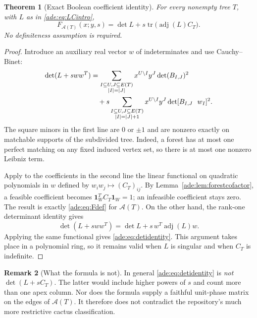 \documentclass[11pt]{article}
\numberwithin{equation}{section}
\newtheorem{theorem}{Theorem}[section]
\theoremstyle{definition}
\newtheorem{remark}[theorem]{Remark}
\newcommand{\one}{\mathbf 1}
\newcommand{\adj}{\operatorname{adj}}
\newcommand{\tr}{\operatorname{tr}}
\newcommand{\calA}{\mathcal A}
\begin{document}
\begin{theorem}[Exact Boolean coefficient identity]
\label{ade:thm:detidentity}
For every nonempty tree $T$, with $L$ as in \eqref{ade:eq:LCintro},
\begin{equation}
 F_{\calA(T)}(x;y,s)
 =\det L+s\tr\bigl(\adj(L)C_T\bigr).
 \label{ade:eq:detidentity}
\end{equation}
No definiteness assumption is required.
\end{theorem}
\begin{proof}
Introduce an auxiliary real vector $w$ of indeterminates and use
Cauchy--Binet:
\begin{align}
 \det(L+sww^T)
 &=\sum_{\substack{I\subseteq U,
                   J\subseteq E(T)\\|I|=|J|}}
      x^{U\setminus I}y^J\det(B_{I,J})^2 \notag\\
 &\quad+s\sum_{\substack{I\subseteq U,
                   J\subseteq E(T)\\|I|=|J|+1}}
      x^{U\setminus I}y^J\det[B_{I,J}\ \ w_I]^2.
 \label{ade:eq:CB}
\end{align}
The square minors in the first line are $0$ or $\pm1$ and are nonzero
exactly on matchable supports of the subdivided tree.  Indeed, a forest
has at most one perfect matching on any fixed induced vertex set, so
there is at most one nonzero Leibniz term.

Apply to the coefficients in the second line the linear functional on
quadratic polynomials in $w$ defined by
$w_iw_j\mapsto(C_T)_{ij}$.  By Lemma~\ref{ade:lem:forestcofactor}, a feasible
coefficient becomes $\one_W^TC_T\one_W=1$; an infeasible coefficient stays
zero.  The result is exactly \eqref{ade:eq:Fdef} for $\calA(T)$.
On the other hand, the rank-one determinant identity gives
\[
 \det(L+sww^T)=\det L+s\,w^T\adj(L)w.
\]
Applying the same functional gives \eqref{ade:eq:detidentity}.
This argument takes place in a polynomial ring, so it remains valid when
$L$ is singular and when $C_T$ is indefinite.
\end{proof}

\begin{remark}[What the formula is not]
In general \eqref{ade:eq:detidentity} is \emph{not}
$\det(L+sC_T)$.  The latter would include higher powers of $s$ and count
more than one apex column.  Nor does the formula supply a faithful
unit-phase matrix on the edges of $\calA(T)$.  It therefore does not
contradict the repository's much more restrictive cactus classification.
\end{remark}
\end{document}
